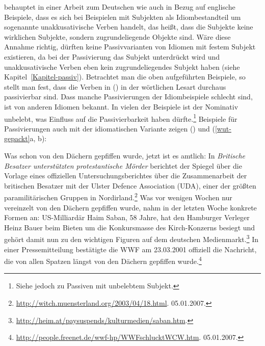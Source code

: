 \citet[]{Scherpenisse86a} behauptet in einer Arbeit zum Deutschen wie auch \citet{Marantz84a}
in Bezug auf englische Beispiele,
dass es sich bei Beispielen mit Subjekten als Idiombestandteil um sogenannte unakkusativische Verben
handelt, das heißt, dass die Subjekte keine wirklichen Subjekte,
sondern zugrundeliegende Objekte sind. 
%
Wäre diese Annahme richtig,
dürften keine Passivvarianten von Idiomen mit festem Subjekt existieren,
da bei der Passivierung das Subjekt unterdrückt wird und unakkusativische
Verben eben kein zugrundeliegendes Subjekt haben (siehe Kapitel~\ref{Kapitel-passiv}).
Betrachtet man die oben aufgeführten Beispiele, so stellt man fest, dass die Verben in
() in der wörtlichen Lesart durchaus passivierbar sind.
Dass manche Passivierungen der Idiombeispiele schlecht sind, ist
von anderen Idiomen bekannt. In vielen der Beispiele ist der Nominativ
unbelebt, was Einfluss auf die Passivierbarkeit haben dürfte.\footnote{
        Siehe jedoch  zu Passiven mit
        unbelebtem Subjekt.%
}
Beispiele für Passivierungen auch mit der idiomatischen Variante zeigen () %
und (\ref{wut-gepackt}a, b):

\eal
\ex Was schon von den Dächern gepfiffen wurde, jetzt ist es amtlich: In \emph{Britische Besatzer unterstützten protestantische Mörder} berichtet der Spiegel über die Vorlage eines offiziellen Untersuchungsberichtes über die Zusammenarbeit der britischen Besatzer mit der Ulster Defence Association (UDA), einer der größten paramilitärischen Gruppen in Nordirland.\footnote{
  \url{http://witch.muensterland.org/2003/04/18.html}. 05.01.2007.
}
\ex Was vor wenigen Wochen nur vereinzelt von den Dächern gepfiffen wurde, nahm in der letzten Woche konkrete Formen an: US-Milliardär Haim Saban, 58 Jahre, hat den Hamburger Verleger Heinz Bauer beim Bieten um die Konkursmasse des Kirch-Konzerns besiegt und gehört damit nun zu den wichtigen Figuren auf dem deutschen Medienmarkt.\footnote{
  \url{http://heim.at/paysuspends/kulturmedien/saban.htm}.
}
\ex In einer Pressemitteilung bestätigte die WWF am 23.03.2001 offiziell die Nachricht, die von allen Spatzen längst von den Dächern gepfiffen wurde.\footnote{
  \url{http://people.freenet.de/wwf-hp/WWFschlucktWCW.htm}. 05.01.2007.
}
\zl

